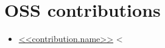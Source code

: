 \section{OSS contributions}
\begin{itemize}
    <%
     \item \href{<<contribution.url>>}{<<contribution.name>>}
    <%
\end{itemize}
